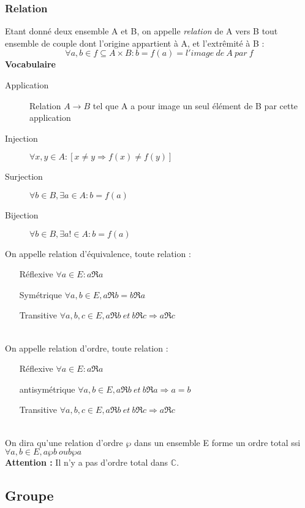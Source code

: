 \documentclass[12pt, a4paper, openany]{article}
\begin{document}
\subsubsection{Relation}
Etant donné deux ensemble A et B, on appelle \textit{relation} de A vers B tout ensemble de couple dont l'origine appartient à A, et l'extrêmité à B :
$$ \forall a, b \in f \subseteq A \times B : b =f(a) = l'image\ de\ A\ par\ f$$
\textbf{Vocabulaire}\\
\begin{description}
\item[Application] Relation $A \longrightarrow B$ tel que A a pour image un seul élément de B par cette application
\item[Injection] $\forall x,y \in A : [x \neq y \Rightarrow f(x) \neq f(y)]$
\item[Surjection] $\forall b \in B, \exists a \in A : b = f(a)$
\item[Bijection] $\forall b \in B, \exists a! \in A : b = f(a)$
\end{description}
On appelle relation d'équivalence, toute relation :
\begin{itemize}
\item[Réflexive] $\forall a \in E : a \Re a$
\item[Symétrique] $\forall a, b \in E, a \Re b = b \Re a$
\item[Transitive] $\forall a, b, c \in E, a \Re b\ et\ b \Re c \Rightarrow a \Re c$
\end{itemize}
\ \ \\
On appelle relation d'ordre, toute relation :
\begin{itemize}
\item[Réflexive] $\forall a \in E : a \Re a$
\item[antisymétrique] $\forall a, b \in E, a \Re b\ et\ b \Re a \Rightarrow a = b$
\item[Transitive] $\forall a, b, c \in E, a \Re b\ et\ b \Re c \Rightarrow a \Re c$
\end{itemize}\ \\
On dira qu'une relation d'ordre $\wp$ dans un ensemble E forme un ordre total ssi $\forall a, b \in E, a \wp b\ ou b \wp a$\\
\textbf{Attention :} Il n'y a pas d'ordre total dans $\mathbb{C}$.


\subsection{Groupe}
\end{document}
